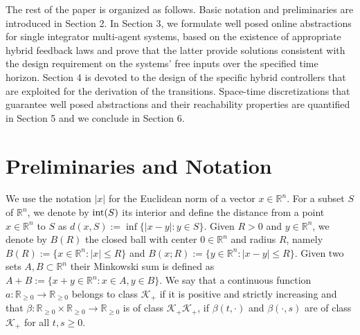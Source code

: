 \documentclass[reqno]{amsart}
\theoremstyle{plain}
\theoremstyle{definition}
\numberwithin{equation}{section}
\begin{document}
The rest of the paper  is organized as follows. Basic notation and preliminaries are introduced in Section 2. In Section 3, we formulate well posed online abstractions for single integrator multi-agent systems, based on the existence of appropriate hybrid feedback laws and prove that the latter provide solutions consistent with the design requirement on the systems' free inputs over the specified time horizon. Section 4 is devoted to the design of the specific hybrid controllers that are exploited for the derivation of the transitions. Space-time discretizations that guarantee well posed abstractions and their reachability properties are quantified in Section 5 and we conclude in Section 6. 

\section{Preliminaries and Notation}

We use the notation $|x|$ for the Euclidean norm of a vector $x\in{\ensuremath{\mathbb{R}^{{n}}}}$. For a subset $S$ of ${\ensuremath{\mathbb{R}^{{n}}}}$, we denote by  ${\rm int}(S)$ its interior and define the distance from a point $x\in{\ensuremath{\mathbb{R}^{{n}}}}$ to $S$ as $d(x,S):=\inf\{|x-y|:y\in S\}$. Given $R>0$ and $y\in{\ensuremath{\mathbb{R}^{{n}}}}$, we denote by $B(R)$ the closed ball with center $0\in{\ensuremath{\mathbb{R}^{{n}}}}$ and radius $R$, namely $B(R):=\{x\in{\ensuremath{\mathbb{R}^{{n}}}}:|x|\le R \}$ and $B(x;R):=\{y\in{\ensuremath{\mathbb{R}^{{n}}}}:|x-y|\le R \}$. Given two sets $A,B\subset{\ensuremath{\mathbb{R}^{{n}}}}$ their Minkowski sum is defined as $A+B:=\{x+y\in{\ensuremath{\mathbb{R}^{{n}}}}:x\in A, y\in B\}$. We say that a continuous function $a:{\ensuremath{\mathbb{R}_{ \geq 0}}}\to{\ensuremath{\mathbb{R}_{ \geq 0}}}$ belongs to class $\mathcal{K}_+$ if it is positive and strictly increasing and that $\beta:{\ensuremath{\mathbb{R}_{ \geq 0}}}\times{\ensuremath{\mathbb{R}_{ \geq 0}}} \to{\ensuremath{\mathbb{R}_{ \geq 0}}}$ is of class $\mathcal{K}_+\mathcal{K}_+$, if $\beta(t,\cdot)$ and $\beta(\cdot,s)$ are of class $\mathcal{K}_+$ for all $t,s\ge 0$.  
\end{document}
